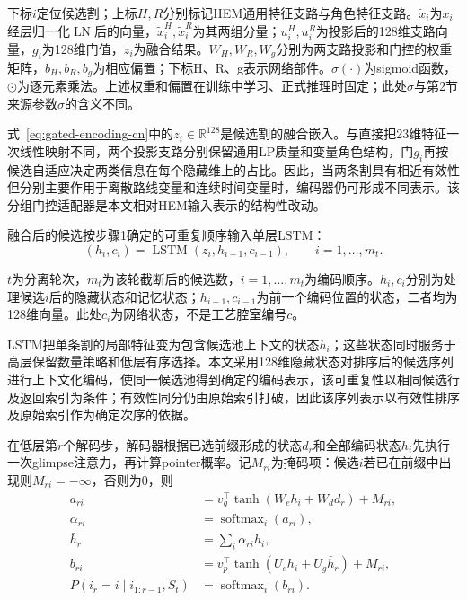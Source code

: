 \documentclass[final,5p,times,twocolumn]{elsarticle}
\begin{document}
下标$i$定位候选割；上标$H,R$分别标记HEM通用特征支路与角色特征支路。$\widetilde x_i$为$x_i$经层归一化$\operatorname{LN}$后的向量，$\widetilde x_i^{H},\widetilde x_i^{R}$为其两组分量；$u_i^{H},u_i^{R}$为投影后的128维支路向量，$g_i$为128维门值，$z_i$为融合结果。$W_H,W_R,W_g$分别为两支路投影和门控的权重矩阵，$b_H,b_R,b_g$为相应偏置；下标H、R、g表示网络部件。$\sigma(\cdot)$为sigmoid函数，$\odot$为逐元素乘法。上述权重和偏置在训练中学习、正式推理时固定；此处$\sigma$与第2节来源参数$\sigma$的含义不同。


式~\eqref{eq:gated-encoding-cn}中的$z_i\in\mathbb R^{128}$是候选割的融合嵌入。与直接把23维特征一次线性映射不同，两个投影支路分别保留通用LP质量和变量角色结构，门$g_i$再按候选自适应决定两类信息在每个隐藏维上的占比。因此，当两条割具有相近有效性但分别主要作用于离散路线变量和连续时间变量时，编码器仍可形成不同表示。该分组门控适配器是本文相对HEM输入表示的结构性改动。

融合后的候选按步骤1确定的可重复顺序输入单层LSTM：
\begin{equation}
(h_i,c_i)=\operatorname{LSTM}(z_i,h_{i-1},c_{i-1}),\qquad i=1,\ldots,m_t .
\label{eq:lstm-encoding-cn}
\end{equation}

$t$为分离轮次，$m_t$为该轮截断后的候选数，$i=1,\ldots,m_t$为编码顺序。$h_i,c_i$分别为处理候选$i$后的隐藏状态和记忆状态；$h_{i-1},c_{i-1}$为前一个编码位置的状态，二者均为128维向量。此处$c_i$为网络状态，不是工艺腔室编号$c$。


LSTM把单条割的局部特征变为包含候选池上下文的状态$h_i$；这些状态同时服务于高层保留数量策略和低层有序选择。本文采用128维隐藏状态对排序后的候选序列进行上下文化编码，使同一候选池得到确定的编码表示，该可重复性以相同候选行及返回索引为条件；有效性同分仍由原始索引打破，因此该序列表示以有效性排序及原始索引作为确定次序的依据。

在低层第$r$个解码步，解码器根据已选前缀形成的状态$d_r$和全部编码状态$h_i$先执行一次glimpse注意力，再计算pointer概率。记$M_{ri}$为掩码项：候选$i$若已在前缀中出现则$M_{ri}=-\infty$，否则为0，则
\begin{equation}
\begin{aligned}
a_{ri}&=v_g^\top\tanh(W_e h_i+W_d d_r)+M_{ri},\\
\alpha_{ri}&=\operatorname{softmax}_i(a_{ri}),\\
\bar h_r&=\sum_i\alpha_{ri}h_i,\\
b_{ri}&=v_p^\top\tanh(U_e h_i+U_g\bar h_r)+M_{ri},\\
P(i_r=i\mid i_{1:r-1},S_t)&=\operatorname{softmax}_i(b_{ri}).
\end{aligned}
\label{eq:pointer-decoding-cn}
\end{equation}
\end{document}
